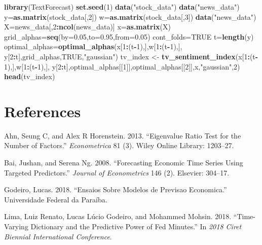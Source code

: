 \documentclass[]{article}
\newenvironment{Shaded}{\begin{snugshade}}{\end{snugshade}}
\newcommand{\KeywordTok}[1]{\textcolor[rgb]{0.13,0.29,0.53}{\textbf{#1}}}
\newcommand{\DataTypeTok}[1]{\textcolor[rgb]{0.13,0.29,0.53}{#1}}
\newcommand{\DecValTok}[1]{\textcolor[rgb]{0.00,0.00,0.81}{#1}}
\newcommand{\FloatTok}[1]{\textcolor[rgb]{0.00,0.00,0.81}{#1}}
\newcommand{\StringTok}[1]{\textcolor[rgb]{0.31,0.60,0.02}{#1}}
\newcommand{\OtherTok}[1]{\textcolor[rgb]{0.56,0.35,0.01}{#1}}
\newcommand{\OperatorTok}[1]{\textcolor[rgb]{0.81,0.36,0.00}{\textbf{#1}}}
\newcommand{\NormalTok}[1]{#1}
\begin{document}
\begin{Shaded}
\begin{Highlighting}[]
\KeywordTok{library}\NormalTok{(TextForecast)}
 \KeywordTok{set.seed}\NormalTok{(}\DecValTok{1}\NormalTok{)}
 \KeywordTok{data}\NormalTok{(}\StringTok{"stock_data"}\NormalTok{)}
 \KeywordTok{data}\NormalTok{(}\StringTok{"news_data"}\NormalTok{)}
\NormalTok{ y=}\KeywordTok{as.matrix}\NormalTok{(stock_data[,}\DecValTok{2}\NormalTok{])}
\NormalTok{ w=}\KeywordTok{as.matrix}\NormalTok{(stock_data[,}\DecValTok{3}\NormalTok{])}
 \KeywordTok{data}\NormalTok{(}\StringTok{"news_data"}\NormalTok{)}
\NormalTok{ X=news_data[,}\DecValTok{2}\OperatorTok{:}\KeywordTok{ncol}\NormalTok{(news_data)]}
\NormalTok{ x=}\KeywordTok{as.matrix}\NormalTok{(X)}
\NormalTok{ grid_alphas=}\KeywordTok{seq}\NormalTok{(}\DataTypeTok{by=}\FloatTok{0.05}\NormalTok{,}\DataTypeTok{to=}\FloatTok{0.95}\NormalTok{,}\DataTypeTok{from=}\FloatTok{0.05}\NormalTok{)}
\NormalTok{ cont_folds=}\OtherTok{TRUE}
\NormalTok{ t=}\KeywordTok{length}\NormalTok{(y)}
\NormalTok{ optimal_alphas=}\KeywordTok{optimal_alphas}\NormalTok{(x[}\DecValTok{1}\OperatorTok{:}\NormalTok{(t}\OperatorTok{-}\DecValTok{1}\NormalTok{),],w[}\DecValTok{1}\OperatorTok{:}\NormalTok{(t}\OperatorTok{-}\DecValTok{1}\NormalTok{),],}
\NormalTok{ y[}\DecValTok{2}\OperatorTok{:}\NormalTok{t],grid_alphas,}\OtherTok{TRUE}\NormalTok{,}\StringTok{"gaussian"}\NormalTok{)}
\NormalTok{  tv_index <-}\StringTok{ }\KeywordTok{tv_sentiment_index}\NormalTok{(x[}\DecValTok{1}\OperatorTok{:}\NormalTok{(t}\OperatorTok{-}\DecValTok{1}\NormalTok{),],w[}\DecValTok{1}\OperatorTok{:}\NormalTok{(t}\OperatorTok{-}\DecValTok{1}\NormalTok{),],}
\NormalTok{ y[}\DecValTok{2}\OperatorTok{:}\NormalTok{t],optimal_alphas[[}\DecValTok{1}\NormalTok{]],optimal_alphas[[}\DecValTok{2}\NormalTok{]],x,}\StringTok{"gaussian"}\NormalTok{,}\DecValTok{2}\NormalTok{)}
 \KeywordTok{head}\NormalTok{(tv_index)}
\end{Highlighting}
\end{Shaded}

\section*{References}\label{references}

\hypertarget{refs}{}
\hypertarget{ref-ahn2013eigenvalue}{}
Ahn, Seung C, and Alex R Horenstein. 2013. ``Eigenvalue Ratio Test for
the Number of Factors.'' \emph{Econometrica} 81 (3). Wiley Online
Library: 1203--27.

\hypertarget{ref-bai2008forecasting}{}
Bai, Jushan, and Serena Ng. 2008. ``Forecasting Economic Time Series
Using Targeted Predictors.'' \emph{Journal of Econometrics} 146 (2).
Elsevier: 304--17.

\hypertarget{ref-godeiro2018ensaios}{}
Godeiro, Lucas. 2018. ``Ensaios Sobre Modelos de Previsao Economica.''
Universidade Federal da Paraíba.

\hypertarget{ref-limagodeiromohsin2018}{}
Lima, Luiz Renato, Lucas Lúcio Godeiro, and Mohammed Mohsin. 2018.
``Time-Varying Dictionary and the Predictive Power of Fed Minutes.'' In
\emph{2018 Ciret Biennial International Conference}.
\end{document}
